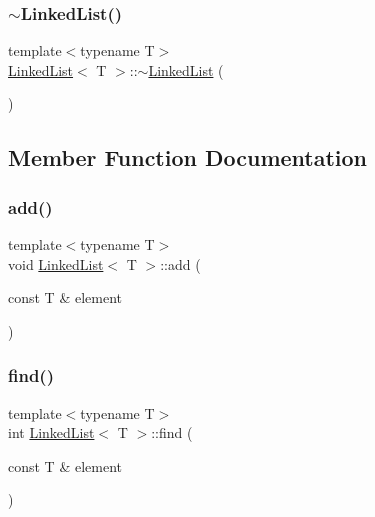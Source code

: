 \mbox{\label{class_linked_list_a7c37609df3b83bc4eb0281b852f93fd7}} 
\subsubsection{\texorpdfstring{$\sim$\+Linked\+List()}{~LinkedList()}}
{\footnotesize\ttfamily template$<$typename T$>$ \\
\mbox{\hyperlink{class_linked_list}{Linked\+List}}$<$ T $>$\+::$\sim$\mbox{\hyperlink{class_linked_list}{Linked\+List}} (\begin{DoxyParamCaption}{ }\end{DoxyParamCaption})\hspace{0.3cm}{\ttfamily [inline]}}



\subsection{Member Function Documentation}
\mbox{\label{class_linked_list_a0083b3395050b2e601388bc7872a03d8}} 
\subsubsection{\texorpdfstring{add()}{add()}}
{\footnotesize\ttfamily template$<$typename T$>$ \\
void \mbox{\hyperlink{class_linked_list}{Linked\+List}}$<$ T $>$\+::add (\begin{DoxyParamCaption}\item[{const T \&}]{element }\end{DoxyParamCaption})\hspace{0.3cm}{\ttfamily [inline]}}

\mbox{\label{class_linked_list_a6f359c1f8a9fded8c89d00a97c4287fb}} 
\subsubsection{\texorpdfstring{find()}{find()}}
{\footnotesize\ttfamily template$<$typename T$>$ \\
int \mbox{\hyperlink{class_linked_list}{Linked\+List}}$<$ T $>$\+::find (\begin{DoxyParamCaption}\item[{const T \&}]{element }\end{DoxyParamCaption})\hspace{0.3cm}{\ttfamily [inline]}}

